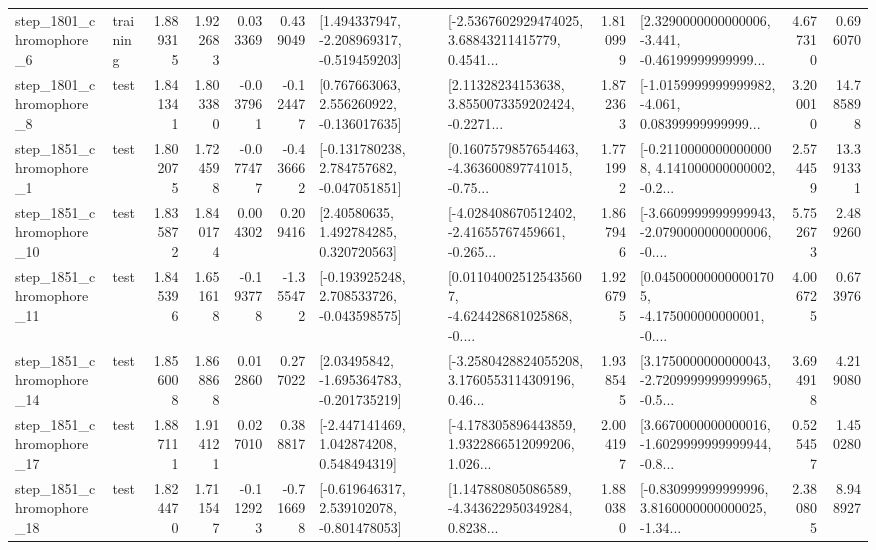 \begin{tabular}{llrrrrllrlrr}
  step\_1801\_chromophore\_6 &  training &      1.889315 &    1.922683 &      0.033369 &  0.439049 &   [1.494337947, -2.208969317, -0.519459203] &  [-2.5367602929474025, 3.68843211415779, 0.4541... &       1.810999 &  [2.3290000000000006, -3.441, -0.46199999999999... &            4.677310 &          0.696070 \\
  step\_1801\_chromophore\_8 &      test &      1.841341 &    1.803380 &     -0.037961 & -0.124477 &    [0.767663063, 2.556260922, -0.136017635] &  [2.11328234153638, 3.8550073359202424, -0.2271... &       1.872363 &  [-1.0159999999999982, -4.061, 0.08399999999999... &            3.200010 &         14.785898 \\
  step\_1851\_chromophore\_1 &      test &      1.802075 &    1.724598 &     -0.077477 & -0.436662 &   [-0.131780238, 2.784757682, -0.047051851] &  [0.1607579857654463, -4.363600897741015, -0.75... &       1.771992 &  [-0.21100000000000008, 4.141000000000002, -0.2... &            2.574459 &         13.391331 \\
 step\_1851\_chromophore\_10 &      test &      1.835872 &    1.840174 &      0.004302 &  0.209416 &      [2.40580635, 1.492784285, 0.320720563] &  [-4.028408670512402, -2.41655767459661, -0.265... &       1.867946 &  [-3.6609999999999943, -2.0790000000000006, -0.... &            5.752673 &          2.489260 \\
 step\_1851\_chromophore\_11 &      test &      1.845396 &    1.651618 &     -0.193778 & -1.355472 &   [-0.193925248, 2.708533726, -0.043598575] &  [0.011040025125435607, -4.624428681025868, -0.... &       1.926795 &  [0.045000000000001705, -4.175000000000001, -0.... &            4.006725 &          0.673976 \\
 step\_1851\_chromophore\_14 &      test &      1.856008 &    1.868868 &      0.012860 &  0.277022 &    [2.03495842, -1.695364783, -0.201735219] &  [-3.2580428824055208, 3.1760553114309196, 0.46... &       1.938545 &  [3.1750000000000043, -2.7209999999999965, -0.5... &            3.694918 &          4.219080 \\
 step\_1851\_chromophore\_17 &      test &      1.887111 &    1.914121 &      0.027010 &  0.388817 &    [-2.447141469, 1.042874208, 0.548494319] &  [-4.178305896443859, 1.9322866512099206, 1.026... &       2.004197 &  [3.6670000000000016, -1.6029999999999944, -0.8... &            0.525457 &          1.450280 \\
 step\_1851\_chromophore\_18 &      test &      1.824470 &    1.711547 &     -0.112923 & -0.716698 &   [-0.619646317, 2.539102078, -0.801478053] &  [1.147880805086589, -4.343622950349284, 0.8238... &       1.880380 &  [-0.830999999999996, 3.8160000000000025, -1.34... &            2.380805 &          8.948927 \\

\end{tabular}
